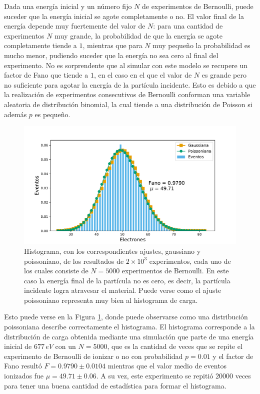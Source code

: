 Dada una energía inicial y un número fijo $N$ de experimentos de Bernoulli, puede suceder que la energía inicial se agote completamente o no. El valor final de la energía depende muy fuertemente del valor de $N$: para una cantidad de experimentos $N$ muy grande, la probabilidad de que la energía se agote completamente tiende a $1$, mientras que para $N$ muy pequeño la probabilidad es mucho menor, pudiendo suceder que la energía no sea cero al final del experimento. No es sorprendente que al simular con este modelo se recupere un factor de Fano que tiende a $1$, en el caso en el que el valor de $N$ es grande pero no suficiente para agotar la energía de la partícula incidente. Esto es debido a que la realización de experimentos consecutivos de Bernoulli conforman una variable aleatoria de distribución binomial, la cual tiende a una distribución de Poisson si además $p$ es pequeño. 
\begin{figure}[h]
    \centering
    \includegraphics[scale=0.5]{Figs/Orden0_fano1.pdf}
    \caption{Histograma, con los correspondientes ajustes, gaussiano y poissoniano, de los resultados de $2\times 10^3$ experimentos, cada uno de los cuales consiste de $N = 5000$ experimentos de Bernoulli. En este caso la energía final de la partícula no es cero, es decir, la partícula incidente logra atravesar el material. Puede verse como el ajuste poissoniano representa muy bien al histograma de carga.}
    \label{fig:SimulacionOrden0Fano1}
\end{figure}
Esto puede verse en la Figura \ref{fig:SimulacionOrden0Fano1}, donde puede observarse como una distribución poissoniana describe correctamente el histograma. El histograma corresponde a la distribución de carga obtenida mediante una simulación que parte de una energía inicial de $677\,\si{eV}$ con un $N = 5000$, que es la cantidad de veces que se repite el experimento de Bernoulli de ionizar o no con probabilidad $p=0.01$ y el factor de Fano resultó $F = 0.9790 \pm 0.0104$ mientras que el valor medio de eventos ionizados fue $\mu = 49.71 \pm 0.06$. A su vez, este experimento se repitió $20000$ veces para tener una buena cantidad de estadística para formar el histograma.

